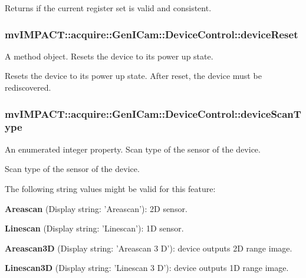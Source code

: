 Returns if the current register set is valid and consistent. \hypertarget{classmv_i_m_p_a_c_t_1_1acquire_1_1_gen_i_cam_1_1_device_control_a21e184091123a7e595203dc108555817}{
\subsubsection[{device\+Reset}]{ mv\+I\+M\+P\+A\+C\+T\+::acquire\+::\+Gen\+I\+Cam\+::\+Device\+Control\+::device\+Reset}}\label{classmv_i_m_p_a_c_t_1_1acquire_1_1_gen_i_cam_1_1_device_control_a21e184091123a7e595203dc108555817}


A method object. Resets the device to its power up state. 

Resets the device to its power up state. After reset, the device must be rediscovered. \hypertarget{classmv_i_m_p_a_c_t_1_1acquire_1_1_gen_i_cam_1_1_device_control_a9a0cf61d40c7454be475abefd64ab35d}{
\subsubsection[{device\+Scan\+Type}]{ mv\+I\+M\+P\+A\+C\+T\+::acquire\+::\+Gen\+I\+Cam\+::\+Device\+Control\+::device\+Scan\+Type}}\label{classmv_i_m_p_a_c_t_1_1acquire_1_1_gen_i_cam_1_1_device_control_a9a0cf61d40c7454be475abefd64ab35d}


An enumerated integer property. Scan type of the sensor of the device. 

Scan type of the sensor of the device.

The following string values might be valid for this feature\+:
\begin{DoxyItemize}
\item {\bfseries Areascan} (Display string\+: 'Areascan')\+: 2\+D sensor.
\item {\bfseries Linescan} (Display string\+: 'Linescan')\+: 1\+D sensor.
\item {\bfseries Areascan3\+D} (Display string\+: 'Areascan 3 D')\+: device outputs 2\+D range image.
\item {\bfseries Linescan3\+D} (Display string\+: 'Linescan 3 D')\+: device outputs 1\+D range image.
\end{DoxyItemize}

